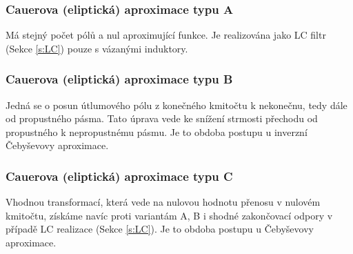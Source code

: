 \subsubsection{Cauerova (eliptická) aproximace typu A}
Má stejný počet pólů a nul aproximující funkce. Je realizována jako LC filtr (Sekce \ref{s:LC}) pouze s vázanými induktory.
\subsubsection{Cauerova (eliptická) aproximace typu B}
Jedná se o posun útlumového pólu z konečného kmitočtu k nekonečnu, tedy dále od propustného pásma. Tato úprava vede ke snížení strmosti přechodu od propustného k nepropustnému pásmu. Je to obdoba postupu u inverzní Čebyševovy aproximace.
\subsubsection{Cauerova (eliptická) aproximace typu C}
Vhodnou transformací, která vede na nulovou hodnotu přenosu v nulovém kmitočtu, získáme navíc proti variantám A, B i shodné zakončovací odpory v případě LC realizace (Sekce \ref{s:LC}). Je to obdoba postupu u Čebyševovy aproximace.
